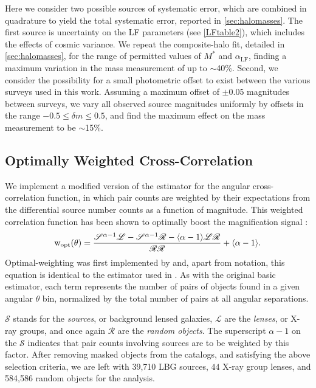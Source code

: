 Here we consider two possible sources of systematic error, which are combined in quadrature to yield the total systematic error, reported in \autoref{sec:halomasses}. The first source is uncertainty on the \ac{LF} parameters (see \autoref{LFtable2}), which includes the effects of cosmic variance. We repeat the composite-halo fit, detailed in \autoref{sec:halomasses}, for the range of permitted values of $M^\ast$ and $\alpha_{\text{LF}}$, finding a maximum variation in the mass measurement of up to $\sim$40\%. Second, we consider the possibility for a small photometric offset to exist between the various surveys used in this work. Assuming a maximum offset of $\pm$0.05 magnitudes between surveys, we vary all observed source magnitudes uniformly by offsets in the range $-0.5 \leq \delta m \leq 0.5$, and find the maximum effect on the mass measurement to be $\sim$15\%.

\subsection{Optimally Weighted Cross-Correlation}
We implement a modified version of the \citet{LandySzalay93} estimator for the angular cross-correlation function, in which pair counts are weighted by their expectations from the differential source number counts as a function of magnitude.  This weighted correlation function has been shown to optimally boost the magnification signal \citep{Menard03}:    
\begin{equation}
\mathrm{w}_{\rm opt}(\theta)=\frac{\mathscr{S}^{\alpha-1} \mathscr{L} - \mathscr{S}^{\alpha-1} \mathscr{R} - \langle \alpha-1 \rangle \mathscr{L}\mathscr{R}}{\mathscr{R}\mathscr{R}} + \langle \alpha-1 \rangle .
\end{equation}
Optimal-weighting was first implemented by \citet{Scranton05} and, apart from notation, this equation is identical to the estimator used in \citet{Hildebrandt09b}.  As with the original basic estimator, each term represents the number of pairs of objects found in a given angular $\theta$ bin, normalized by the total number of pairs at all angular separations.  

$\mathscr{S}$ stands for the {\it sources}, or background lensed galaxies, $\mathscr{L}$ are the {\it lenses}, or X-ray groups, and once again $\mathscr{R}$ are the {\it random objects}. The superscript $\alpha-1$ on the $\mathscr{S}$ indicates that pair counts involving sources are to be weighted by this factor.  After removing masked objects from the catalogs, and satisfying the above selection criteria, we are left with 39,710 \ac{LBG} sources, $44$ X-ray group lenses, and 584,586 random objects for the analysis.

